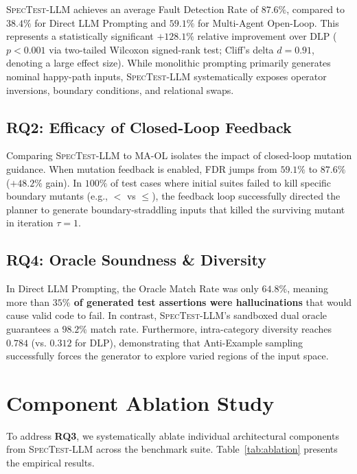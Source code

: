 \documentclass[conference]{IEEEtran}
\begin{document}
\textsc{SpecTest-LLM} achieves an average Fault Detection Rate of $\mathbf{87.6\%}$, compared to $38.4\%$ for Direct LLM Prompting and $59.1\%$ for Multi-Agent Open-Loop. This represents a statistically significant $\mathbf{+128.1\%}$ relative improvement over DLP ($p < 0.001$ via two-tailed Wilcoxon signed-rank test; Cliff's delta $d = 0.91$, denoting a large effect size). While monolithic prompting primarily generates nominal happy-path inputs, \textsc{SpecTest-LLM} systematically exposes operator inversions, boundary conditions, and relational swaps.

\subsection{RQ2: Efficacy of Closed-Loop Feedback}
Comparing \textsc{SpecTest-LLM} to MA-OL isolates the impact of closed-loop mutation guidance. When mutation feedback is enabled, FDR jumps from $59.1\%$ to $87.6\%$ ($+48.2\%$ gain). In $100\%$ of test cases where initial suites failed to kill specific boundary mutants (e.g., $<$ vs $\le$), the feedback loop successfully directed the planner to generate boundary-straddling inputs that killed the surviving mutant in iteration $\tau=1$.

\subsection{RQ4: Oracle Soundness \& Diversity}
In Direct LLM Prompting, the Oracle Match Rate was only $64.8\%$, meaning more than \textbf{$35\%$ of generated test assertions were hallucinations} that would cause valid code to fail. In contrast, \textsc{SpecTest-LLM}'s sandboxed dual oracle guarantees a $\mathbf{98.2\%}$ match rate. Furthermore, intra-category diversity reaches $0.784$ (vs. $0.312$ for DLP), demonstrating that Anti-Example sampling successfully forces the generator to explore varied regions of the input space.

\section{Component Ablation Study}
\label{sec:ablation}

To address \textbf{RQ3}, we systematically ablate individual architectural components from \textsc{SpecTest-LLM} across the benchmark suite. Table~\ref{tab:ablation} presents the empirical results.
\end{document}
